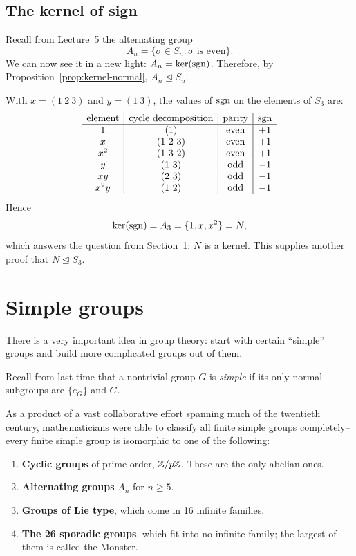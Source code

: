 \documentclass[reqno,11pt]{amsart}
\begin{document}
\subsection*{The kernel of sign}

Recall from Lecture~5 the alternating group
\[
  A_n=\{\sigma\in S_n:\sigma\text{ is even}\}.
\]
We can now see it in a new light: $A_n=\ker(\operatorname{sgn})$. Therefore, by
Proposition~\ref{prop:kernel-normal}, $A_n\trianglelefteq S_n$.

\begin{example}[Sign on $S_3$]
With $x=(1\ 2\ 3)$ and $y=(1\ 3)$, the values of $\operatorname{sgn}$ on
the elements of $S_3$ are:
\[
\begin{array}{c|c|c|c}
  \text{element}&\text{cycle decomposition}&\text{parity}&\operatorname{sgn} \\ \hline
  1    &(1)       &\text{even}&+1\\
  x    &(1\ 2\ 3)&\text{even}&+1\\
  x^2  &(1\ 3\ 2)&\text{even}&+1\\
  y    &(1\ 3)   &\text{odd} &-1\\
  xy   &(2\ 3)   &\text{odd} &-1\\
  x^2y &(1\ 2)   &\text{odd} &-1
\end{array}
\]
Hence
\[
  \ker(\operatorname{sgn})=A_3=\{1,x,x^2\}=N,
\]
which answers the question from Section~1: $N$ is a kernel. This supplies
another proof that $N\trianglelefteq S_3$.
\end{example}

\section{Simple groups}

There is a very important idea in group theory: start with certain
``simple'' groups and build more complicated groups out of them.

\begin{define}
	Recall from last time that a nontrivial group $G$ is \emph{simple} if
	its only normal subgroups are $\{e_G\}$ and $G$.
\end{define}

As a product of a vast collaborative
effort spanning much of the twentieth century,  mathematicians were able to classify all finite
simple groups completely-- every
finite simple group is isomorphic to one of the following:

\begin{enumerate}
	\item \textbf{Cyclic groups} of prime order, $\mathbb{Z}/p\mathbb{Z}$. These are the only abelian ones.
	\item \textbf{Alternating groups} $A_n$ for $n \geq 5$.
	\item \textbf{Groups of Lie type}, which come in 16 infinite families.
	\item \textbf{The 26 sporadic groups}, which fit into no infinite family; the largest of them is called the Monster.
\end{enumerate}
\end{document}
